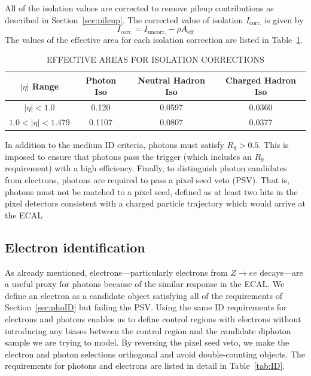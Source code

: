 All of the isolation values are corrected to remove pileup contributions as described in Section~\ref{sec:pileup}. The corrected value of isolation $I_{\mathrm{corr.}}$ is given by 
\begin{equation}
I_{\mathrm{corr.}} = I_{\mathrm{uncorr.}} - \rho A_{\mathrm{eff}}
\end{equation}
The values of the effective area for each isolation correction are listed in Table~\ref{tab:EA}.

\begin{table}[ht]
    \caption{EFFECTIVE AREAS FOR ISOLATION CORRECTIONS}
    \centering
    \begin{tabular}{ | c | c | c | c |}
        \hline
        	\hline
        \textbf{$|\eta|$ Range} & \textbf{Photon Iso} & \textbf{Neutral Hadron Iso} & \textbf{Charged Hadron Iso} \\ [0.5ex]
        \hline
        	$|\eta| < 1.0 $                 & 0.120   &  0.0597 & 0.0360\\
	$ 1.0 < |\eta| < 1.479 $   & 0.1107 & 0.0807 & 0.0377 \\
		 \hline
           \hline
    \end{tabular}
    \label{tab:EA}
\end{table}
In addition to the medium ID criteria, photons must satisfy $R_9 > 0.5$. This is imposed to ensure that photons pass the trigger (which includes an $R_9$ requirement) with a high efficiency. Finally, to distinguish photon candidates from electrons, photons are required to pass a pixel seed veto (PSV). That is, photons must not be matched to a pixel seed, defined as at least two hits in the pixel detectors consistent with a charged particle trajectory which would arrive at the ECAL 

\subsection{Electron identification}
\label{sec:eleID}
As already mentioned, electrons---particularly electrons from $Z\rightarrow ee$ decays---are a useful proxy for photons because of the similar response in the ECAL. We define an electron as a candidate object satisfying all of the requirements of Section~\ref{sec:phoID} but failing the PSV. Using the same ID requirements for electrons and photons enables us to define control regions with electrons without introducing any biases between the control region and the candidate diphoton sample we are trying to model. By reversing the pixel seed veto, we make the electron and photon selections orthogonal and avoid double-counting objects. The requirements for photons and electrons are listed in detail in Table~\ref{tab:ID}. 

